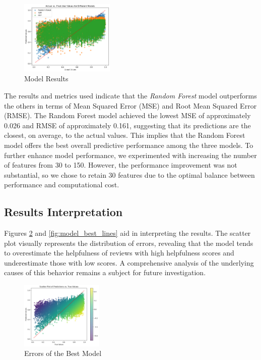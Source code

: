 \begin{figure}[H]
    \centering
    \includegraphics[width=0.4\textwidth]{./figures/model_results.png}
    \caption{Model Results}
    \label{fig:model_results}
\end{figure}

\noindent
The results and metrics used indicate that the \textit{Random Forest} model outperforms the others in terms of Mean Squared Error (MSE)
and Root Mean Squared Error (RMSE). The Random Forest model achieved the lowest MSE of approximately 0.026 and RMSE of approximately 0.161,
suggesting that its predictions are the closest, on average, to the actual values. This implies that the Random Forest model offers the
best overall predictive performance among the three models. To further enhance model performance, we experimented with increasing the
number of features from 30 to 150. However, the performance improvement was not substantial, so we chose to retain 30 features due to the
optimal balance between performance and computational cost.

\subsection*{Results Interpretation}
Figures \ref{fig:model_best_scatter} and \ref{fig:model_best_lines} aid in interpreting the results. The scatter plot visually represents
the distribution of errors, revealing that the model tends to overestimate the helpfulness of reviews with high helpfulness scores and
underestimate those with low scores. A comprehensive analysis of the underlying causes of this behavior remains a subject for future investigation.

\begin{figure}[H]
    \centering
    \includegraphics[width=0.35\textwidth]{./figures/model_best_scatter.png}
    \caption{Errors of the Best Model}
    \label{fig:model_best_scatter}
\end{figure}


